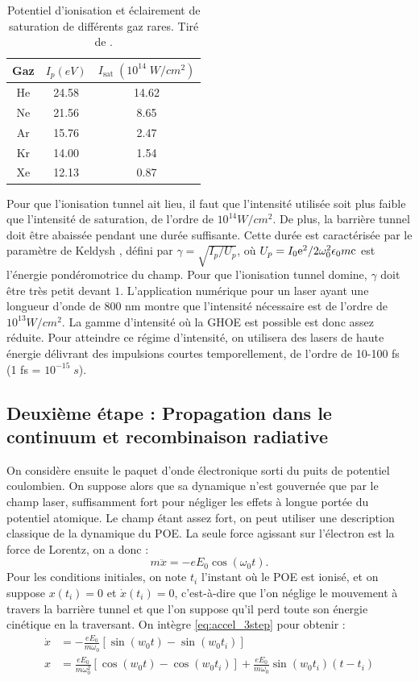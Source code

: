 \begin{table}[h!]
\begin{tabular}{|c|c|c|}
  \hline
  Gaz & $I_p (\si{eV})$ & $I_{\text{sat}}\;(10^{14}\;\si{W/cm^2})$\\
  \hline
  He & 24.58 & 14.62 \\
  Ne & 21.56 & 8.65 \\
	Ar & 15.76 & 2.47 \\
	Kr & 14.00 & 1.54\\
	Xe & 12.13 & 0.87 \\
  \hline	
\end{tabular}
\centering
\caption{Potentiel d'ionisation et éclairement de saturation de différents gaz rares. Tiré de .}
\label{tab:Isat}
\end{table}
Pour que l'ionisation tunnel ait lieu, il faut que l'intensité utilisée soit plus faible que l'intensité de saturation, de l'ordre de $10^{14}\si{W/cm^2}$. De plus, la barrière tunnel doit être abaissée pendant une durée suffisante. Cette durée est caractérisée par le paramètre de Keldysh , défini par $\gamma = \sqrt{I_p/U_p}$, où $U_p = I_0 \mathrm{e}^2/2\omega_0^2\epsilon_0 m \mathrm{c}$ est l'énergie pondéromotrice du champ. Pour que l'ionisation tunnel domine, $\gamma$ doit être très petit devant $1$. L'application numérique pour un laser ayant une longueur d'onde de 800 nm montre que l'intensité nécessaire est de l'ordre de ${10^{13}}\si{W/cm^2}$. La gamme d'intensité où la GHOE est possible est donc assez réduite. Pour atteindre ce régime d'intensité, on utilisera des lasers de haute énergie délivrant des impulsions courtes temporellement, de l'ordre de 10-100 fs (1 fs = $10^{-15}\;s$).

\subsection{Deuxième étape : Propagation dans le continuum et recombinaison radiative}
On considère ensuite le paquet d'onde électronique sorti du puits de potentiel coulombien. On suppose alors que sa dynamique n'est gouvernée que par le champ laser, suffisamment fort pour négliger les effets à longue portée du potentiel atomique. Le champ étant assez fort, on peut utiliser une description classique de la dynamique du POE. La seule force agissant sur l'électron est la force de Lorentz, on a donc :
\begin{equation}
m\ddot{x} = -eE_0 \cos(\omega_0 t).
\label{eq:accel_3step}
\end{equation}
Pour les conditions initiales, on note $t_i$ l'instant où le POE est ionisé, et on suppose $x(t_i) = 0$ et $\dot{x}(t_i) = 0$, c'est-à-dire que l'on néglige le mouvement à travers la barrière tunnel et que l'on suppose qu'il perd toute son énergie cinétique en la traversant. On intègre \ref{eq:accel_3step} pour obtenir :
\begin{align}
\dot{x}&=-\frac{eE_0}{m\omega_0} [\sin{(w_0t)}-\sin{(w_0t_i)}]\\
x&=\frac{eE_0}{m\omega_0^2} [\cos{(w_0t)}-\cos{(w_0t_i)}]+\frac{eE_0}{m\omega_0}\sin{(w_0t_i)}(t-t_i)
\label{eq:pos_3step}
\end{align}

